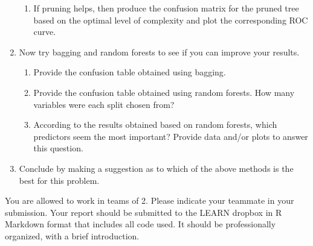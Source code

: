 \documentclass[11pt]{article}
\begin{document}
\begin{enumerate}
\begin{enumerate}
    \item If pruning helps, then produce the confusion matrix for the pruned tree based on the optimal level of complexity and plot the corresponding ROC curve.
  \end{enumerate}
\item Now try bagging and random forests to see if you can improve your results.
  \begin{enumerate}
  \item Provide the confusion table obtained using bagging.
  \item Provide the confusion table obtained using random forests. How many variables were each split chosen from? 
      \item According to the results obtained based on random forests, which predictors seem the most important? Provide data and/or plots to answer this question.
  \end{enumerate}
  \item Conclude by making a suggestion as to which of the above methods is the best for this problem.
\end{enumerate}

You are allowed to work in teams of 2. Please indicate your teammate in your submission.
Your report should be submitted to the LEARN dropbox in R Markdown format that includes all code used. 
It should be professionally organized, with a brief introduction.
\end{document}
